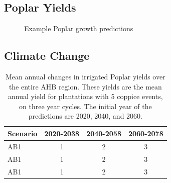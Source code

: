 \documentclass[preprint,12pt]{elsarticle}
\begin{document}
\subsection{Poplar Yields}
\label{sec:yield}

\begin{figure}[hp]
  \centering
  
  \caption{Example Poplar growth predictions}
  \label{fig:examples}
\end{figure}



    

\subsection{Climate Change}
\label{sec:climate-change}


\begin{table}[hp]
  \centering
  \begin{tabular}{|l|c|c|c|}
    \hline
    Scenario & 2020-2038 & 2040-2058 & 2060-2078 \\
    \hline
    \ac{AB1} & 1 & 2 & 3 \\
    \ac{AB1} & 1 & 2 & 3 \\
    \ac{AB1} & 1 & 2 & 3 \\
    \hline    
  \end{tabular}
  \caption{Mean annual changes in irrigated Poplar yields  over the entire \ac{AHB} region.  
These yields are the mean annual yield for plantations with 5 coppice events, on three year cycles.
The initial year of the predictions are 2020, 2040, and 2060.}
  \label{tab:potential}
\end{table}
\end{document}
